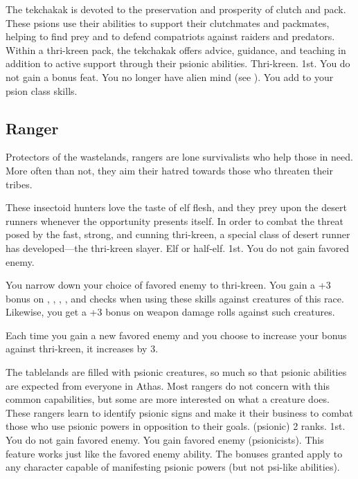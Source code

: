 {The tekchakak is devoted to the preservation and prosperity of clutch and pack. These psions use their abilities to support their clutchmates and packmates, helping to find prey and to defend compatriots against raiders and predators. Within a thri-kreen pack, the tekchakak offers advice, guidance, and teaching in addition to active support through their psionic abilities.}
{Thri-kreen.}
{1st.}
{You do not gain a bonus feat.}
{
	You no longer have alien mind (see ). You add  to your psion class skills.
}


\subsection{Ranger}
Protectors of the wastelands, rangers are lone survivalists who help those in need. More often than not, they aim their hatred towards those who threaten their tribes.

{These insectoid hunters love the taste of elf flesh, and they prey upon the desert runners whenever the  opportunity presents itself. In order to combat the threat posed by the fast, strong, and cunning thri-kreen, a special class of desert runner has developed---the thri-kreen slayer.}
{Elf or half-elf.}
{1st.}
{You do not gain favored enemy.}
{
	You narrow down your choice of favored enemy to thri-kreen. You gain a +3 bonus on , , , , and  checks when using these skills against creatures of this race. Likewise, you get a +3 bonus on weapon damage rolls against such creatures.

	Each time you gain a new favored enemy and you choose to increase your bonus against thri-kreen, it increases by 3.
}
{The tablelands are filled with psionic creatures, so much so that psionic abilities are expected from everyone in Athas. Most rangers do not concern with this common capabilities, but some are more interested on what a creature does. These rangers learn to identify psionic signs and make it their business to combat those who use psionic powers in opposition to their goals.}
{ (psionic) 2 ranks.}
{1st.}
{You do not gain favored enemy.}
{
	You gain favored enemy (psionicists). This feature works just like the favored enemy ability. The bonuses granted apply to any character capable of manifesting psionic powers (but not psi-like abilities).
}

